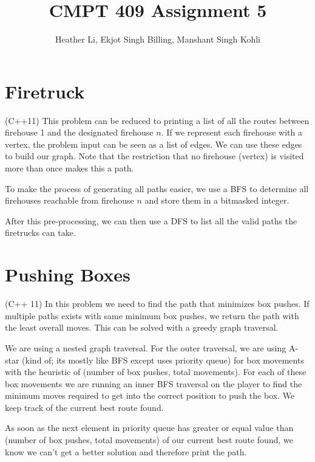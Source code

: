\documentclass{article}
\title{CMPT 409 Assignment 5}
\author{Heather Li, Ekjot Singh Billing, Manshant Singh Kohli}
\begin{document}
\maketitle

\section{Firetruck}
(C++11) 
This problem can be reduced to printing a list of all the routes between firehouse 1 and the designated firehouse $n$. If we represent each firehouse with a vertex, the problem input can be seen as a list of edges. We can use these edges to build our graph. Note that the restriction that no firehouse (vertex) is visited more than once makes this a path.
\par 
To make the process of generating all paths easier, we use a BFS to determine all firehouses reachable from firehouse $n$ and store them in a bitmasked integer.
\par 
After this pre-processing, we can then use a DFS to list all the valid paths the firetrucks can take.

\section{Pushing Boxes}
(C++ 11) In this problem we need to find the path that minimizes box pushes. If multiple paths exists with same minimum box pushes, we return the path with the least overall moves. This can be solved with a greedy graph traversal.
\par
We are using a nested graph traversal. For the outer traversal, we are using A-star (kind of; its mostly like BFS except uses priority queue) for box movements with the heuristic of (number of box pushes, total movements). For each of these box movements we are running an inner BFS traversal on the player to find the minimum moves required to get into the correct position to push the box. We keep track of the current best route found.
\par
As soon as the next element in priority queue has greater or equal value than (number of box pushes, total movements) of our current best route found, we know we can't get a better solution and therefore print the path.
\end{document}
